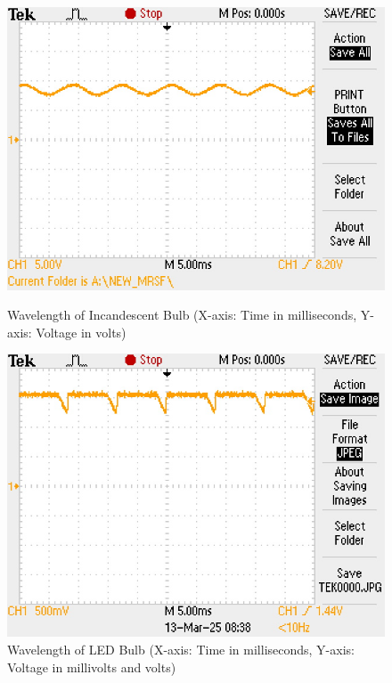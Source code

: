 \documentclass[12pt]{article}
\begin{document}
\begin{figure}[H]
        \vspace{1cm} %
        \\
        \begin{minipage}{0.45\textwidth}
        \centering
        \includegraphics[width=\textwidth]{Incandescent Graph.jpg}
        \caption{Wavelength of Incandescent Bulb (X-axis: Time in milliseconds, Y-axis: Voltage in volts)}
        \label{fig:incandescent}
        \end{minipage}
        \hfill
        \begin{minipage}{0.45\textwidth}
        \centering
        \includegraphics[width=\textwidth]{LED Graph.jpg}
        \caption{Wavelength of LED Bulb (X-axis: Time in milliseconds, Y-axis: Voltage in millivolts and volts)}
        \label{fig:led}
    \end{minipage}
\end{figure}
\end{document}
